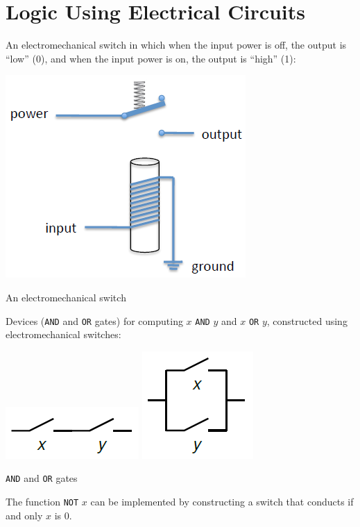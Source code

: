 \documentclass[8pt,a4paper,compress,handout]{beamer}
\begin{document}
\section{Logic Using Electrical Circuits}
\begin{frame}[fragile]
An electromechanical switch in which when the input power is off, the output is ``low'' (0), and when the input power is on, the output is ``high'' (1):
\begin{center}
\includegraphics[scale=0.22]{figures/em_switch.png}

\smallskip

\tiny An electromechanical switch
\end{center}

\bigskip

Devices (\lstinline{AND} and \lstinline{OR} gates) for computing $x$ \lstinline{AND} $y$ and $x$ \lstinline{OR} $y$, constructed using electromechanical switches:
\begin{center}
\includegraphics[scale=0.22]{figures/and_gate.png}\hspace{1cm} \includegraphics[scale=0.22]{figures/or_gate.png}

\smallskip

\tiny \lstinline{AND} and \lstinline{OR} gates
\end{center}

\bigskip

The function \lstinline{NOT} $x$ can be implemented by constructing a switch that conducts if and only $x$ is 0.
\end{frame}
\end{document}
